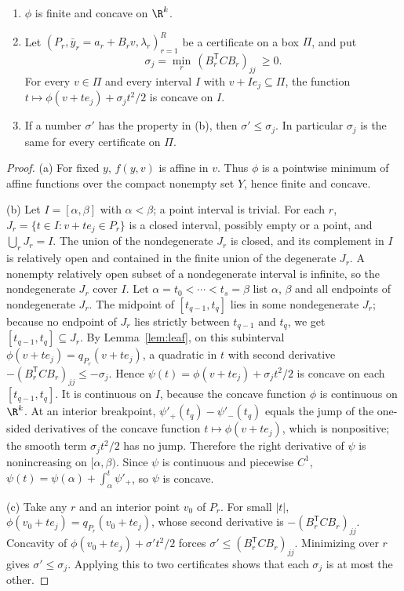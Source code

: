 \begin{proposition}\label{prop:vf-curv}
\begin{enumerate}
\item[(a)] $\phi$ is finite and concave on $\R^k$.
\item[(b)] Let $(P_r,\bar y_r=a_r+B_rv,\lambda_r)_{r=1}^R$ be a certificate on a
box $\Pi$, and put
\[
\sigma_j=\min_r\,(B_r^{\mathsf T}CB_r)_{jj}\ \ge0.
\]
For every $v\in\Pi$ and every interval $I$ with $v+Ie_j\subseteq\Pi$, the
function $t\mapsto\phi(v+te_j)+\sigma_jt^2/2$ is concave on $I$.
\item[(c)] If a number $\sigma'$ has the property in (b), then
$\sigma'\le\sigma_j$. In particular $\sigma_j$ is the same for every
certificate on $\Pi$.
\end{enumerate}
\end{proposition}

\begin{proof}
(a) For fixed $y$, $f(y,v)$ is affine in $v$. Thus $\phi$ is a pointwise
minimum of affine functions over the compact nonempty set $Y$, hence finite
and concave.

(b) Let $I=[\alpha,\beta]$ with $\alpha<\beta$; a point interval is trivial.
For each $r$, $J_r=\{t\in I:v+te_j\in P_r\}$ is a closed interval, possibly
empty or a point, and $\bigcup_rJ_r=I$. The union of the nondegenerate $J_r$
is closed, and its complement in $I$ is relatively open and contained in the
finite union of the degenerate $J_r$. A nonempty relatively open subset of a
nondegenerate interval is infinite, so the nondegenerate $J_r$ cover $I$. Let
$\alpha=t_0<\cdots<t_s=\beta$ list $\alpha$, $\beta$ and all endpoints of
nondegenerate $J_r$. The midpoint of $[t_{q-1},t_q]$ lies in some nondegenerate
$J_r$; because no endpoint of $J_r$ lies strictly between $t_{q-1}$ and $t_q$,
we get $[t_{q-1},t_q]\subseteq J_r$. By Lemma~\ref{lem:leaf}, on this subinterval
$\phi(v+te_j)=q_{P_r}(v+te_j)$, a quadratic in $t$ with second derivative
$-(B_r^{\mathsf T}CB_r)_{jj}\le-\sigma_j$. Hence
$\psi(t)=\phi(v+te_j)+\sigma_jt^2/2$ is concave on each $[t_{q-1},t_q]$. It is
continuous on $I$, because the concave function $\phi$ is continuous on $\R^k$.
At an interior breakpoint, $\psi'_+(t_q)-\psi'_-(t_q)$ equals the jump of the
one-sided derivatives of the concave function $t\mapsto\phi(v+te_j)$, which is
nonpositive; the smooth term $\sigma_jt^2/2$ has no jump. Therefore the right
derivative of $\psi$ is nonincreasing on $[\alpha,\beta)$. Since $\psi$ is
continuous and piecewise $C^1$, $\psi(t)=\psi(\alpha)+\int_\alpha^t\psi'_+$, so
$\psi$ is concave.

(c) Take any $r$ and an interior point $v_0$ of $P_r$. For small $|t|$,
$\phi(v_0+te_j)=q_{P_r}(v_0+te_j)$, whose second derivative is
$-(B_r^{\mathsf T}CB_r)_{jj}$. Concavity of $\phi(v_0+te_j)+\sigma't^2/2$ forces
$\sigma'\le(B_r^{\mathsf T}CB_r)_{jj}$. Minimizing over $r$ gives
$\sigma'\le\sigma_j$. Applying this to two certificates shows that each
$\sigma_j$ is at most the other.
\end{proof}

